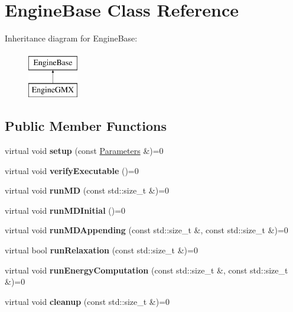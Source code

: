 \hypertarget{classEngineBase}{}\section{Engine\+Base Class Reference}
\label{classEngineBase}
Inheritance diagram for Engine\+Base\+:\begin{figure}[H]
\begin{center}
\leavevmode
\includegraphics[height=2.000000cm]{classEngineBase}
\end{center}
\end{figure}
\subsection*{Public Member Functions}
\begin{DoxyCompactItemize}
\item 
\mbox{\label{classEngineBase_a823f088e68a7d10c8ebe18b775629662}} 
virtual void {\bfseries setup} (const \mbox{\hyperlink{classParameters}{Parameters}} \&)=0
\item 
\mbox{\label{classEngineBase_a0ef622ef971e22057befd63b9e368c6f}} 
virtual void {\bfseries verify\+Executable} ()=0
\item 
\mbox{\label{classEngineBase_add0a383b0c76ee4ffabf0e5941288161}} 
virtual void {\bfseries run\+MD} (const std\+::size\+\_\+t \&)=0
\item 
\mbox{\label{classEngineBase_ad5334c6c938b757a04916a9502d9c3d6}} 
virtual void {\bfseries run\+M\+D\+Initial} ()=0
\item 
\mbox{\label{classEngineBase_a548dbdbed3c16043f1b188717c8c95f8}} 
virtual void {\bfseries run\+M\+D\+Appending} (const std\+::size\+\_\+t \&, const std\+::size\+\_\+t \&)=0
\item 
\mbox{\label{classEngineBase_a603c3fed18ba5fcb1961e0811d6643f2}} 
virtual bool {\bfseries run\+Relaxation} (const std\+::size\+\_\+t \&)=0
\item 
\mbox{\label{classEngineBase_ad826ddbf873563ce03c38568e0118bcf}} 
virtual void {\bfseries run\+Energy\+Computation} (const std\+::size\+\_\+t \&, const std\+::size\+\_\+t \&)=0
\item 
\mbox{\label{classEngineBase_a1de376fba7c90dc89e8a05e5787a442c}} 
virtual void {\bfseries cleanup} (const std\+::size\+\_\+t \&)=0
\end{DoxyCompactItemize}
